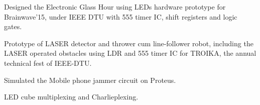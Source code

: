 

\vspace{5mm}
\begin{cvitems}
\item {Designed the Electronic Glass Hour using LEDs hardware prototype for Brainwave'15, under IEEE DTU with 555 timer IC, shift registers and logic gates.
}
\item {Prototype of LASER detector and thrower cum line-follower robot, including the LASER operated obstacles using LDR and 555 timer IC for TROIKA, the annual technical fest of IEEE-DTU.
}
\item {Simulated the Mobile phone jammer circuit on Proteus.
}
\item {LED cube multiplexing and Charlieplexing.
}
\end{cvitems}